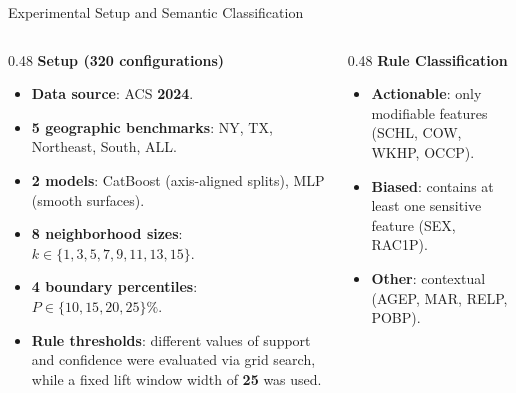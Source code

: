 \documentclass[10pt,aspectratio=169]{beamer}
\begin{document}
\begin{frame}{Experimental Setup and Semantic Classification}
  \begin{columns}[T,onlytextwidth]
    \begin{column}{0.48\textwidth}
      \textbf{Setup (320 configurations)}
      \begin{itemize}\small
        \item \textbf{Data source}: ACS \textbf{2024}.
        \item \textbf{5 geographic benchmarks}: NY, TX, Northeast, South, ALL.
        \item \textbf{2 models}: CatBoost (axis-aligned splits), MLP (smooth surfaces).
        \item \textbf{8 neighborhood sizes}:\\ $k \in \{1, 3, 5, 7, 9, 11, 13, 15\}$.
        \item \textbf{4 boundary percentiles}:\\ $P \in \{10, 15, 20, 25\}\%$.
        \item \textbf{Rule thresholds}: different values of support and confidence were evaluated via grid search, while a fixed lift window width of \textbf{25} was used.
      \end{itemize}
    \end{column}
    \begin{column}{0.48\textwidth}
      \textbf{Rule Classification}
      \begin{itemize}\small
        \item \textbf{Actionable}: only modifiable features (SCHL, COW, WKHP, OCCP).
        \item \textbf{Biased}: contains at least one sensitive feature (SEX, RAC1P).
        \item \textbf{Other}: contextual (AGEP, MAR, RELP, POBP).
        
      \end{itemize}
    \end{column}
  \end{columns}
\end{frame}
\end{document}
